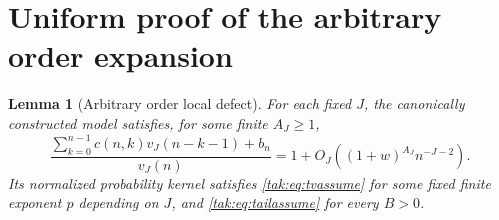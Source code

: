 \documentclass[11pt,letterpaper]{article}
\newtheorem{lemma}[theorem]{Lemma}
\theoremstyle{remark}\newtheorem{remark}[theorem]{Remark}
\begin{document}
\section{Uniform proof of the arbitrary order expansion}\label{tak:sec:allproof}
\begin{lemma}[Arbitrary order local defect]\label{tak:lem:alllocal}
For each fixed $J$, the canonically constructed model satisfies, for some finite $A_J\geq1$,
\begin{equation}
 \frac{\sum_{k=0}^{n-1}c(n,k)v_J(n-k-1)+b_n}{v_J(n)}
 =1+O_J((1+w)^{A_J}n^{-J-2}).\label{tak:eq:alllocal}
\end{equation}
Its normalized probability kernel satisfies \eqref{tak:eq:tvassume} for some fixed finite exponent $p$ depending on $J$, and \eqref{tak:eq:tailassume} for every $B>0$.
\end{lemma}
\end{document}
